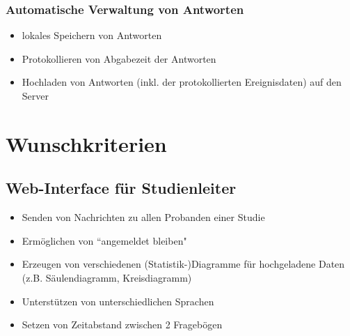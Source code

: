 \documentclass[a4paper]{scrreprt}
\begin{document}
                \subsubsection{Automatische Verwaltung von Antworten}
                    \begin{itemize}
                        \item lokales Speichern von Antworten
                        \item Protokollieren von Abgabezeit der Antworten
                        \item Hochladen von Antworten (inkl. der protokollierten Ereignisdaten) auf den Server
                    \end{itemize}


                \vspace*{0.5cm}


        \section{Wunschkriterien}

            \subsection{Web-Interface f\"ur Studienleiter}
                \begin{itemize}
                    \item Senden von Nachrichten zu allen \gls{Proband}en einer Studie
                    \item Erm\"oglichen von ``angemeldet bleiben"
                    \item Erzeugen von verschiedenen (Statistik-)Diagramme f\"ur hochgeladene Daten (z.B. S\"aulendiagramm, Kreisdiagramm)
                    \item Unterst\"utzen von unterschiedlichen Sprachen
                    \item Setzen von Zeitabstand zwischen 2 Frageb\"ogen

                \end{itemize}

\end{document}

